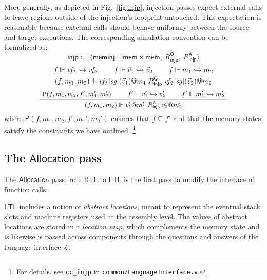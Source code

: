 \documentclass[sigplan,10pt,review,anonymous]{acmart}
\newcommand{\kw}[1]{\ensuremath{ \mathsf{#1} }}
\begin{document}
More generally,
as depicted in Fig.~\ref{fig:injp},
injection passes expect external calls
to leave regions outside of the injection's footprint untouched.
This expectation is reasonable because
external calls
should behave uniformly between the source and target executions.
The corresponding simulation convention
can be formalized as:
\[
  \kw{injp} :=
    \langle
      \kw{meminj} \times \kw{mem} \times \kw{mem}, \:
      R_\kw{injp}^\kw{Q}, \:
      R_\kw{injp}^\kw{A}
    \rangle
\]
\[
  \AxiomC{$f \Vdash \mathit{vf_1} \hookrightarrow \mathit{vf_2}$}
  \AxiomC{$f \Vdash \vec{v}_1 \hookrightarrow \vec{v}_2$}
  \AxiomC{$f \Vdash m_1 \hookrightarrow m_2$}
  \TrinaryInfC{$(f, m_1, m_2) \Vdash
    \mathit{vf_1}[\mathit{sg}](\vec{v}_1)@m_1
    \mathrel{R_\kw{injp}^\kw{Q}}
    \mathit{vf_2}[\mathit{sg}](\vec{v}_2)@m_2$}
  \DisplayProof
\]
\[
  \small
  \AxiomC{$\kw{P}(f, m_1, m_2, f', m_1', m_2')$}
  \AxiomC{$f' \Vdash v_1' \hookrightarrow v_2'$}
  \AxiomC{$f' \Vdash m_1' \hookrightarrow m_2'$}
  \TrinaryInfC{$(f, m_1, m_2) \Vdash
    v_1'@m_1'
    \mathrel{R_\kw{injp}^\kw{A}}
    v_2'@m_2'$}
  \DisplayProof
\]
where $\kw{P}(f, m_1, m_2, f', m_1', m_2')$
ensures that $f \subseteq f'$ and that the memory states
satisfy the constraints we have outlined.%
\footnote{For details,
  see \texttt{cc\_injp} in \texttt{common/LanguageInterface.v}.}


\subsection{The \kw{Allocation} pass} %

The \kw{Allocation} pass from \kw{RTL} to \kw{LTL}
is the first pass to modify the interface of function calls.

\kw{LTL} includes a notion of \emph{abstract locations},
meant to represent the eventual stack slots and machine registers
used at the assembly level.
The values of abstract locations are stored in a \emph{location map},
which complements the memory state and is likewise
is passed across components through
the questions and answers of the language interface $\mathcal{L}$.
\end{document}
